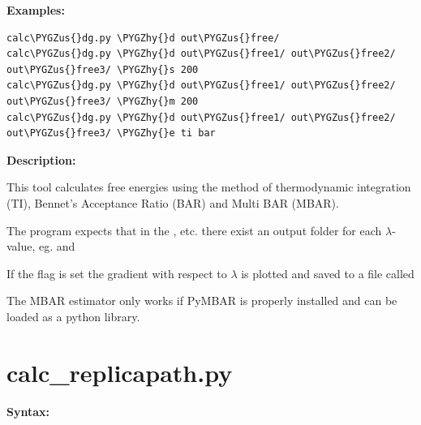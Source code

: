 \documentclass[letterpaper,10pt,english]{sphinxmanual}
\def\PYGZus{\char`\_}
\def\PYGZhy{\char`\-}
\begin{document}
\textbf{Examples:}

\begin{Verbatim}[frame=single,commandchars=\\\{\}]
calc\PYGZus{}dg.py \PYGZhy{}d out\PYGZus{}free/
calc\PYGZus{}dg.py \PYGZhy{}d out\PYGZus{}free1/ out\PYGZus{}free2/ out\PYGZus{}free3/ \PYGZhy{}s 200
calc\PYGZus{}dg.py \PYGZhy{}d out\PYGZus{}free1/ out\PYGZus{}free2/ out\PYGZus{}free3/ \PYGZhy{}m 200
calc\PYGZus{}dg.py \PYGZhy{}d out\PYGZus{}free1/ out\PYGZus{}free2/ out\PYGZus{}free3/ \PYGZhy{}e ti bar
\end{Verbatim}

\textbf{Description:}

This tool calculates free energies using the method of thermodynamic integration (TI), Bennet's Acceptance Ratio (BAR) and Multi BAR (MBAR).

The program expects that in the ,  etc. there exist an output folder for each \(\lambda\)-value, eg.  and 

If the  flag is set the gradient with respect to \(\lambda\) is plotted and saved to a file called 

The MBAR estimator only works if PyMBAR is properly installed and can be loaded as a python library.


\section{calc\_replicapath.py}
\label{tools:calc-replicapath-py}
\textbf{Syntax:}
\end{document}
